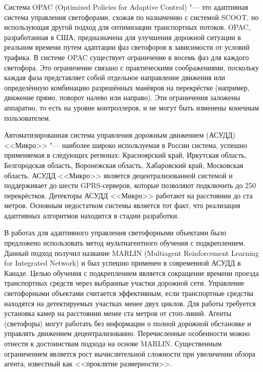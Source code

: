 \documentclass[11pt]{ubs}
\begin{document}
Система OPAC (Optimized Policies for Adaptive Control)\cite{gartner1990} "--- это адаптивная система управления светофорами, схожая по назначению с системой SCOOT, но использующая другой подход для оптимизации транспортных потоков. OPAC, разработанная в США, предназначена для улучшения дорожной ситуации в реальном времени путем адаптации фаз светофоров в зависимости от условий трафика. В системе OPAC существует ограничение в восемь фаз для каждого светофора. Это ограничение связано с практическими соображениями, поскольку каждая фаза представляет собой отдельное направление движения или определённую комбинацию разрешённых манёвров на перекрёстке (например, движение прямо, поворот налево или направо). Эти ограничения заложены аппаратно, то есть на уровне контроллеров, и не могут быть изменены конечным пользователем.

Автоматизированная система управления дорожным движением (АСУДД) <<Микро>> \cite{asudd} "--- наиболее широко используемая в России система, успешно применяемая в следующих регионах:  Красноярский край, Иркутская область, Белгородская область, Воронежская область, Хабаровский край, Московская область. АСУДД <<Микро>> является децентрализованной системой и поддерживает до шести GPRS-серверов, которые позволяют подключить до 250 перекрёстков.  Детекторы АСУДД <<Микро>> работают на расстоянии до ста метров. Основным недостатком системы является тот факт, что реализация адаптивных алгоритмов  находится в стадии разработки.

В работах \cite{el-tantawy2013, tislenko2022a, tislenko2022b} для адаптивного управления светофорными объектами было предложено использовать  метод мультиагентного обучения с подкреплением.  
Данный подход получил название MARLIN (Multiagent Reinforcement Learning for Integrated Network) и  был успешно применен в современной АСУДД в Канаде. Целью обучения с подкреплением является сокращение времени проезда транспортных средств через выбранные участки дорожной сети. Управление светофорными объектами считается эффективным, если транспортные средства находятся на детектируемых участках менее двух циклов.
Для работы требуется установка камер на расстоянии менее ста метров от стоп-линий. Агенты (светофоры) могут работать без информации о полной дорожной обстановке и управлять движением децентрализованно. Перечисленные особенности можно отнести к достоинствам подхода на основе MARLIN. Существенным ограничением является рост вычислительной сложности при увеличении обзора агента, известный как <<проклятие размерности>>.
\end{document}

